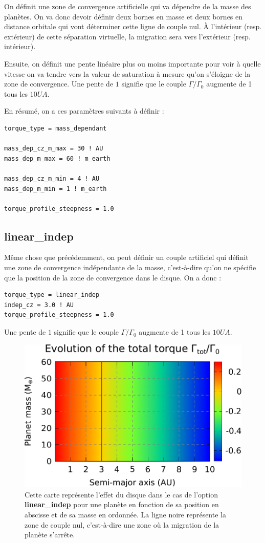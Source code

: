 On définit une zone de convergence artificielle qui va dépendre de la masse des planètes. On va donc devoir définir deux bornes en masse et deux bornes en distance orbitale qui vont déterminer cette ligne de couple nul. À l'intérieur (resp. extérieur) de cette séparation virtuelle, la migration sera vers l'extérieur (resp. intérieur).

Ensuite, on définit une pente linéaire plus ou moins importante pour voir à quelle vitesse on va tendre vers la valeur de
saturation à mesure qu'on s'éloigne de la zone de convergence. Une pente de $1$ signifie que le couple $\Gamma/\Gamma_0$
augmente de 1 tous les $10\unit{UA}$.

En résumé, on a ces paramètres suivants à définir : 
\begin{verbatim}
torque_type = mass_dependant

mass_dep_cz_m_max = 30 ! AU
mass_dep_m_max = 60 ! m_earth

mass_dep_cz_m_min = 4 ! AU
mass_dep_m_min = 1 ! m_earth

torque_profile_steepness = 1.0
\end{verbatim}

\subsection{linear\_indep}\label{sec:linear_indep}
Même chose que précédemment, on peut définir un couple artificiel qui définit une zone de convergence indépendante de la masse, c'est-à-dire qu'on ne spécifie que la position de la zone de convergence dans le disque. On a donc : 
\begin{verbatim}
torque_type = linear_indep
indep_cz = 3.0 ! AU
torque_profile_steepness = 1.0
\end{verbatim}

Une pente de $1$ signifie que le couple $\Gamma/\Gamma_0$ augmente de 1 tous les $10\unit{UA}$.

\begin{figure}[htbp]
\centering
\includegraphics[width=0.65\linewidth]{figure/migration_map/linear_indep.pdf}
\caption[Carte de migration correspondant à une zone de convergence \textbf{linear\_indep}.]{Cette carte représente l'effet du
disque dans le cas de l'option \textbf{linear\_indep} pour une planète en fonction de sa position en abscisse et de sa masse en
ordonnée. La ligne noire représente la zone de couple nul, c'est-à-dire une zone où la migration de la planète s'arrête.}
\end{figure}

